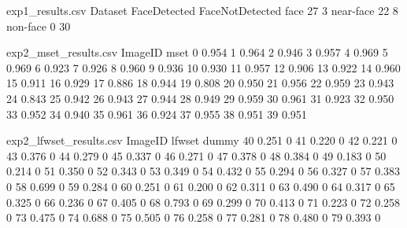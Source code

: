 \begin{filecontents}{exp1_results.csv}
	Dataset FaceDetected FaceNotDetected
	face 27 3 
	near-face 22 8 
	non-face 0 30 
\end{filecontents}

\begin{filecontents}{exp2_mset_results.csv}
	ImageID mset
	0 0.954  
	1 0.964  
	2 0.946  
	3 0.957  
	4 0.969  
	5 0.969  
	6 0.923  
	7 0.926  
	8 0.960  
	9 0.936  
	10 0.930 
	11 0.957 
	12 0.906 
	13 0.922 
	14 0.960 
	15 0.911 
	16 0.929 
	17 0.886 
	18 0.944 
	19 0.808 
	20 0.950 
	21 0.956 
	22 0.959 
	23 0.943 
	24 0.843 
	25 0.942 
	26 0.943 
	27 0.944 
	28 0.949 
	29 0.959 
	30 0.961 
	31 0.923 
	32 0.950 
	33 0.952 
	34 0.940 
	35 0.961 
	36 0.924 
	37 0.955 
	38 0.951 
	39 0.951 
\end{filecontents}

\begin{filecontents}{exp2_lfwset_results.csv}
	ImageID lfwset dummy
	40 0.251 0
	41 0.220 0
	42 0.221 0
	43 0.376 0
	44 0.279 0
	45 0.337 0
	46 0.271 0
	47 0.378 0
	48 0.384 0
	49 0.183 0
	50 0.214 0
	51 0.350 0
	52 0.343 0
	53 0.349 0
	54 0.432 0
	55 0.294 0
	56 0.327 0
	57 0.383 0
	58 0.699 0
	59 0.284 0
	60 0.251 0
	61 0.200 0
	62 0.311 0
	63 0.490 0
	64 0.317 0
	65 0.325 0
	66 0.236 0
	67 0.405 0
	68 0.793 0
	69 0.299 0
	70 0.413 0
	71 0.223 0
	72 0.258 0
	73 0.475 0
	74 0.688 0
	75 0.505 0
	76 0.258 0
	77 0.281 0
	78 0.480 0
	79 0.393 0
\end{filecontents}